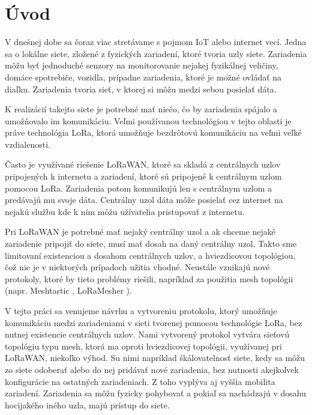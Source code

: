 \documentclass[slovak,master]{diploma}
\begin{document}
\MakeTitlePages

\listoffigures
\clearpage

\listoftables
\clearpage

\chapter{Úvod}
V dnešnej dobe sa čoraz viac stretávame s pojmom IoT alebo internet vecí. Jedna sa o lokálne siete, zložené z fyzických zariadení, ktoré tvoria uzly siete.
Zariadenia môžu byť jednoduché senzory na monitorovanie nejakej fyzikálnej veličiny, domáce spotrebiče, vozidla, prípadne 
zariadenia, ktoré je možné ovládať na diaľku. Zariadenia tvoria sieť, v ktorej si môžu medzi sebou posielať 
dáta.

K realizácií takejto siete je potrebné mať niečo, čo by zariadenia spájalo a umožňovalo im komunikáciu. Veľmi používanou technológiou
v tejto oblasti je práve technológia LoRa, ktorá umožňuje bezdrôtovú komunikáciu na veľmi veľké vzdialenosti.

Často je využívané riešenie LoRaWAN, ktoré sa skladá z centrálnych uzlov pripojených k internetu a zariadení, ktoré sú pripojené k centrálnym uzlom pomocou LoRa. 
Zariadenia potom komunikujú len s centrálnym uzlom a predávajú mu svoje dáta. Centrálny uzol dáta môže posielať cez internet na nejakú službu kde 
k ním môžu užívatelia pristupovať z internetu.

Pri LoRaWAN je potrebné mať nejaký centrálny uzol a ak chceme nejaké zariadenie pripojiť do siete, musí mať dosah na daný centrálny uzol. 
Takto sme limitovaní existenciou a dosahom centrálnych uzlov, a hviezdicovou topológiou, čož nie je v niektorých prípadoch užitia vhodné. Neustále vznikajú nové 
protokoly, ktoré by tieto problémy riešili, napríklad za použitia mesh topológii (napr. Meshtastic \cite{meshtastic}, LoRaMesher \cite{loramesher}).

V tejto práci sa venujeme návrhu a vytvoreniu protokolu, ktorý umožňuje komunikáciu medzi zariadeniami v sieti tvorenej pomocou technológie LoRa,
bez nutnej existencie centrálnych uzlov. Nami vytvorený protokol vytvára sieťovú topológiu typu mesh, ktorá ma oproti hviezdicovej topológii, 
využívanej pri LoRaWAN, niekoľko výhod. Su nimi napríklad škálovatelnosť siete, kedy sa môžu zo siete odoberať alebo do nej pridávať nové zariadenia, 
bez nutnosti akejkoľvek konfigurácie na ostatných zariadeniach. Z toho vyplýva aj vyššia mobilita zariadení. Zariadenia sa môžu fyzicky pohybovať a 
pokiaľ sa nachádzajú v dosahu hocijakého iného uzla, majú prístup do siete.
\end{document}
